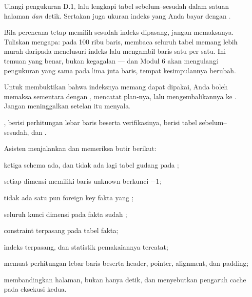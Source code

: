 Ulangi pengukuran D.1, lalu lengkapi tabel sebelum--sesudah dalam satuan
halaman \emph{dan} detik. Sertakan juga ukuran indeks yang Anda bayar dengan
.

\begin{catatan}
Bila perencana tetap memilih  sesudah indeks dipasang,
jangan memaksanya. Tuliskan mengapa: pada 100 ribu baris, membaca seluruh
tabel memang lebih murah daripada menelusuri indeks lalu mengambil baris satu
per satu. Ini temuan yang benar, bukan kegagalan --- dan Modul 6 akan
mengulangi pengukuran yang sama pada lima juta baris, tempat kesimpulannya
berubah.

Untuk membuktikan bahwa indeksnya memang dapat dipakai, Anda boleh memaksa
sementara dengan , mencatat plan-nya, lalu
mengembalikannya ke . Jangan meninggalkan setelan itu menyala.
\end{catatan}

\begin{luaran}
,  berisi
perhitungan lebar baris beserta verifikasinya, 
berisi tabel sebelum--sesudah, dan .
\end{luaran}

\begin{checkpoint}
Asisten menjalankan  dan memeriksa butir berikut:
\begin{ceklis}
  \item ketiga schema ada, dan tidak ada lagi tabel gudang pada
        ;
  \item setiap dimensi memiliki baris unknown berkunci $-1$;
  \item tidak ada satu pun foreign key fakta yang ;
  \item seluruh kunci dimensi pada fakta sudah ;
  \item constraint  terpasang pada tabel fakta;
  \item indeks terpasang, dan statistik pemakaiannya tercatat;
  \item {} memuat perhitungan lebar baris beserta
        header, pointer, alignment, dan padding;
  \item {} membandingkan halaman, bukan hanya detik,
        dan menyebutkan pengaruh cache pada eksekusi kedua.
\end{ceklis}
\end{checkpoint}

